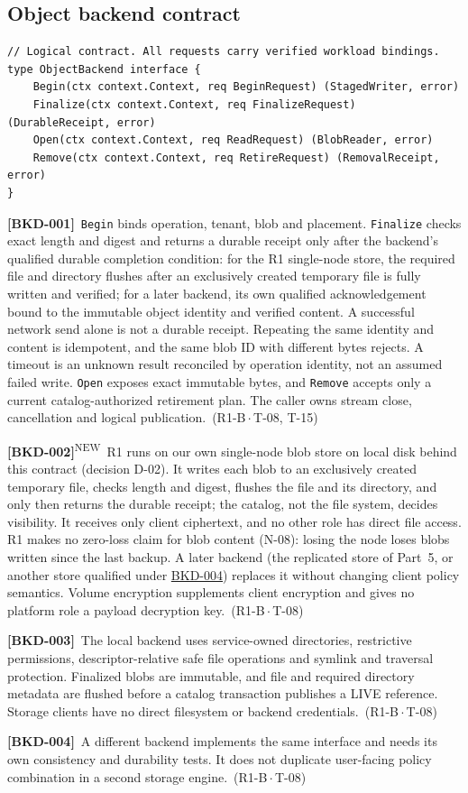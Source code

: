 \documentclass[11pt,a4paper]{article}
\newcommand{\code}[1]{{\small\nolinkurl{#1}}}
\newcommand{\rr}[1]{\hyperlink{req:#1}{#1}}
\newcommand{\reqtag}[2]{{\footnotesize\color{accent}(#1\,$\cdot$\,#2)}}
\newcommand{\req}[4]{\par\noindent\hypertarget{req:#1}{\textbf{[#1]}}\ #4\ \reqtag{#2}{#3}\par}
\newcommand{\reqn}[4]{\par\noindent\hypertarget{req:#1}{\textbf{[#1]}}\textsuperscript{\color{accent}\tiny NEW}\ #4\ \reqtag{#2}{#3}\par}
\begin{document}
\subsection{Object backend contract}
\begin{lstlisting}
// Logical contract. All requests carry verified workload bindings.
type ObjectBackend interface {
    Begin(ctx context.Context, req BeginRequest) (StagedWriter, error)
    Finalize(ctx context.Context, req FinalizeRequest) (DurableReceipt, error)
    Open(ctx context.Context, req ReadRequest) (BlobReader, error)
    Remove(ctx context.Context, req RetireRequest) (RemovalReceipt, error)
}
\end{lstlisting}
\req{BKD-001}{R1-B}{T-08, T-15}{\code{Begin} binds operation, tenant, blob and placement. \code{Finalize} checks exact length and digest and returns a durable receipt only after the backend's qualified durable completion condition: for the R1 single-node store, the required file and directory flushes after an exclusively created temporary file is fully written and verified; for a later backend, its own qualified acknowledgement bound to the immutable object identity and verified content. A successful network send alone is not a durable receipt. Repeating the same identity and content is idempotent, and the same blob ID with different bytes rejects. A timeout is an unknown result reconciled by operation identity, not an assumed failed write. \code{Open} exposes exact immutable bytes, and \code{Remove} accepts only a current catalog-authorized retirement plan. The caller owns stream close, cancellation and logical publication.}
\reqn{BKD-002}{R1-B}{T-08}{R1 runs on our own single-node blob store on local disk behind this contract (decision D-02). It writes each blob to an exclusively created temporary file, checks length and digest, flushes the file and its directory, and only then returns the durable receipt; the catalog, not the file system, decides visibility. It receives only client ciphertext, and no other role has direct file access. R1 makes no zero-loss claim for blob content (N-08): losing the node loses blobs written since the last backup. A later backend (the replicated store of Part~5, or another store qualified under \rr{BKD-004}) replaces it without changing client policy semantics. Volume encryption supplements client encryption and gives no platform role a payload decryption key.}
\req{BKD-003}{R1-B}{T-08}{The local backend uses service-owned directories, restrictive permissions, descriptor-relative safe file operations and symlink and traversal protection. Finalized blobs are immutable, and file and required directory metadata are flushed before a catalog transaction publishes a LIVE reference. Storage clients have no direct filesystem or backend credentials.}
\req{BKD-004}{R1-B}{T-08}{A different backend implements the same interface and needs its own consistency and durability tests. It does not duplicate user-facing policy combination in a second storage engine.}
\end{document}
